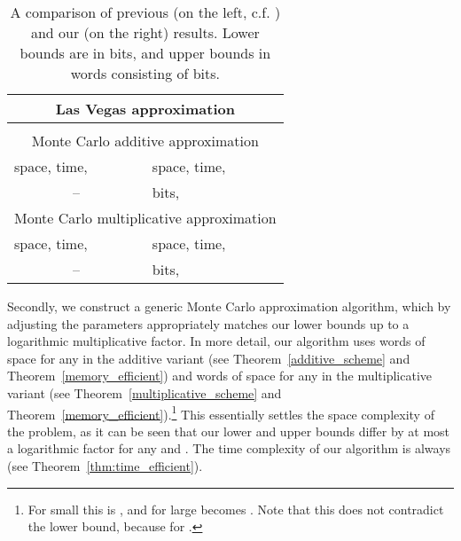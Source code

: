 \documentclass{article}[11pt,letter]
\begin{document}
\begin{table}[t!]

\begin{tabular}{p{}p{}}
	\toprule		
		\multicolumn{2}{c}{Las Vegas approximation}\\
		\midrule
		 &  \\
		\midrule
		\multicolumn{2}{c}{Monte Carlo additive approximation}\\
		\midrule
		 space,  time,  &  space,  time, \\
	
		\multicolumn{1}{c}{--} &  bits,  \\
		\midrule
		\multicolumn{2}{c}{Monte Carlo multiplicative approximation}\\
		\midrule
		 space,  time,  &  space,  time, \\

		\multicolumn{1}{c}{--} &  bits, \\
		\bottomrule
	\end{tabular}
	\caption{
    A comparison of previous (on the left, c.f. \cite{Berenbrink}) and our (on the right) results. Lower bounds are in bits, and upper bounds in words consisting of  bits.
\label{table:results}
}

\end{table}

Secondly, we construct a generic 
Monte Carlo approximation algorithm, which by adjusting the parameters appropriately matches our lower bounds up to a logarithmic multiplicative 
factor.
In more detail, our algorithm uses  words of space for any  in the additive variant (see Theorem~\ref{additive_scheme} and
Theorem~\ref{memory_efficient}) and  words of space for any 
in the multiplicative variant (see Theorem~\ref{multiplicative_scheme} and Theorem~\ref{memory_efficient}).\footnote{For 
small  this is , and for large  becomes .
Note that this does not contradict the lower bound, because  for .}
This essentially settles the space complexity of the problem, as it can be seen that our lower and upper bounds differ by at most a logarithmic factor
for any  and .
The time complexity of our algorithm is always  (see Theorem~\ref{thm:time_efficient}).
\end{document}
